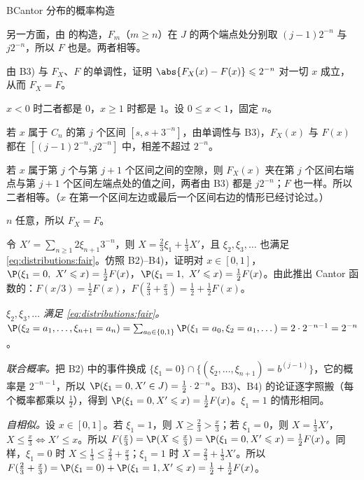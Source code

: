 \begin{probleme}{B}{Cantor 分布的概率构造}
\begin{questions}
\begin{solution}
另一方面，由 的构造，$F_m$（$m\geqslant n$）在 $J$ 的两个端点处分别取 $(j-1)2^{-n}$ 与 $j2^{-n}$，所以 $F$ 也是。两者相等。
\end{solution}
\item 由 B3) 与 $F_X$、$F$ 的单调性，证明 $\abs{F_X(x)-F(x)}\leqslant2^{-n}$ 对一切 $x$ 成立，从而 $F_X=F$。
\begin{solution}
$x<0$ 时二者都是 $0$，$x\geqslant1$ 时都是 $1$。设 $0\leqslant x<1$，固定 $n$。

若 $x$ 属于 $C_n$ 的第 $j$ 个区间 $[s,s+3^{-n}]$，由单调性与 B3)，$F_X(x)$ 与 $F(x)$ 都在 $[(j-1)2^{-n},j2^{-n}]$ 中，相差不超过 $2^{-n}$。

若 $x$ 属于第 $j$ 个与第 $j+1$ 个区间之间的空隙，则 $F_X(x)$ 夹在第 $j$ 个区间右端点与第 $j+1$ 个区间左端点处的值之间，两者由 B3) 都是 $j2^{-n}$；$F$ 也一样。所以二者相等。（$x$ 在第一个区间左边或最后一个区间右边的情形已经讨论过。）

$n$ 任意，所以 $F_X=F$。
\end{solution}
\item 令 $X'=\sum_{n\geqslant1}2\xi_{n+1}3^{-n}$，则 $X=\frac23\xi_1+\frac13X'$，且 $\xi_2,\xi_3,\dots$ 也满足 \eqref{eq:distributions:fair}。仿照 B2)--B4)，证明对 $x\in[0,1]$，$\P(\xi_1=0,\ X'\leqslant x)=\frac12F(x)$，$\P(\xi_1=1,\ X'\leqslant x)=\frac12F(x)$。由此推出 Cantor 函数的：$F(x/3)=\frac12F(x)$，$F(\frac23+\frac x3)=\frac12+\frac12F(x)$。
\begin{solution}
\emph{$\xi_2,\xi_3,\dots$ 满足 \eqref{eq:distributions:fair}。}$\P(\xi_2=a_1,\dots,\xi_{n+1}=a_n)=\sum_{a_0\in\{0,1\}}\P(\xi_1=a_0,\xi_2=a_1,\dots)=2\cdot2^{-n-1}=2^{-n}$。

\emph{联合概率。}把 B2) 中的事件换成 $\{\xi_1=0\}\cap\{(\xi_2,\dots,\xi_{n+1})=b^{(j-1)}\}$，它的概率是 $2^{-n-1}$，所以 $\P(\xi_1=0,X'\in J)=\frac12\cdot2^{-n}$。B3)、B4) 的论证逐字照搬（每个概率都乘以 $\frac12$），得到 $\P(\xi_1=0,X'\leqslant x)=\frac12F(x)$。$\xi_1=1$ 的情形相同。

\emph{自相似。}设 $x\in[0,1]$。若 $\xi_1=1$，则 $X\geqslant\frac23>\frac x3$；若 $\xi_1=0$，则 $X=\frac13X'$，$X\leqslant\frac x3\iff X'\leqslant x$。所以 $F(\frac x3)=\P(X\leqslant\frac x3)=\P(\xi_1=0,X'\leqslant x)=\frac12F(x)$。同样，$\xi_1=0$ 时 $X\leqslant\frac13\leqslant\frac23+\frac x3$；$\xi_1=1$ 时 $X=\frac23+\frac13X'$。所以 $F(\frac23+\frac x3)=\P(\xi_1=0)+\P(\xi_1=1,X'\leqslant x)=\frac12+\frac12F(x)$。


\end{solution}
\end{questions}
\end{probleme}
